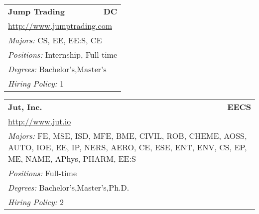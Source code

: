 \documentclass[twoside]{article}
\begin{document}
\begin{center}
\begin{multicols}{3}
\begin{FlushLeft}
\begin{minipage}{\columnwidth}
\end{minipage}
 
\begin{minipage}{\columnwidth}\begin{tabularx}{.95\columnwidth}{Xr}
                 {\Large\bf Jump Trading} & {\Large\bf DC}\\
    \multicolumn{2}{p{.95\columnwidth}}{\url{http://www.jumptrading.com}}\\
    \multicolumn{2}{p{.95\columnwidth}}{\emph{Majors:} CS, EE, EE:S, CE}\\
    \multicolumn{2}{p{.95\columnwidth}}{\emph{Positions:} Internship, Full-time}\\
    \multicolumn{2}{p{.95\columnwidth}}{\emph{Degrees:} Bachelor's,Master's}\\
    \multicolumn{2}{p{.95\columnwidth}}{\emph{Hiring Policy:} 1}\\
    \end{tabularx}
    
\end{minipage}
 
\begin{minipage}{\columnwidth}\begin{tabularx}{.95\columnwidth}{Xr}
                 {\Large\bf Jut, Inc.} & {\Large\bf EECS}\\
    \multicolumn{2}{p{.95\columnwidth}}{\url{http://www.jut.io}}\\
    \multicolumn{2}{p{.95\columnwidth}}{\emph{Majors:} FE, MSE, ISD, MFE, BME, CIVIL, ROB, CHEME, AOSS, AUTO, IOE, EE, IP, NERS, AERO, CE, ESE, ENT, ENV, CS, EP, ME, NAME, APhys, PHARM, EE:S}\\
    \multicolumn{2}{p{.95\columnwidth}}{\emph{Positions:} Full-time}\\
    \multicolumn{2}{p{.95\columnwidth}}{\emph{Degrees:} Bachelor's,Master's,Ph.D.}\\
    \multicolumn{2}{p{.95\columnwidth}}{\emph{Hiring Policy:} 2}\\
    \end{tabularx}
    
\end{minipage}
 

\end{FlushLeft}
\end{multicols}
\end{center}
\end{document}
